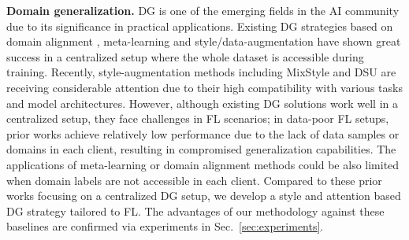 \documentclass{article}
\theoremstyle{plain}
\theoremstyle{definition}
\theoremstyle{remark}
\begin{document}
\textbf{Domain generalization.}  DG is one of the emerging fields in the AI community due to its significance in practical applications.  Existing DG strategies based on domain alignment  \cite{li2018domain, li2018deep, li2018domaincc},  meta-learning \cite{li2019episodic, du2020learning, li2018learning, zhao2021learning}  and style/data-augmentation  \cite{zhou2021domain,li2022uncertainty,zhang2022exact, zhou2020learning} have shown great success in a centralized setup where the whole dataset is accessible during training.   Recently, style-augmentation methods \cite{zhou2021domain,li2022uncertainty,zhang2022exact} including MixStyle \cite{zhou2021domain} and DSU \cite{li2022uncertainty} are receiving considerable attention  due to their high compatibility with various tasks and  model architectures.  However, although existing DG solutions work well in a centralized setup, they face challenges in FL scenarios; %
in data-poor FL setups, prior works achieve relatively low performance due to the lack of  data samples or domains in each client, resulting in compromised generalization capabilities.   %
The applications of meta-learning or domain alignment methods could be also limited when domain labels are not accessible in each client. Compared to these prior works focusing on  a centralized DG setup, we develop a style and attention based DG strategy tailored to  FL.  The advantages of our methodology against these baselines are   confirmed via experiments in Sec.~\ref{sec:experiments}.
\end{document}
